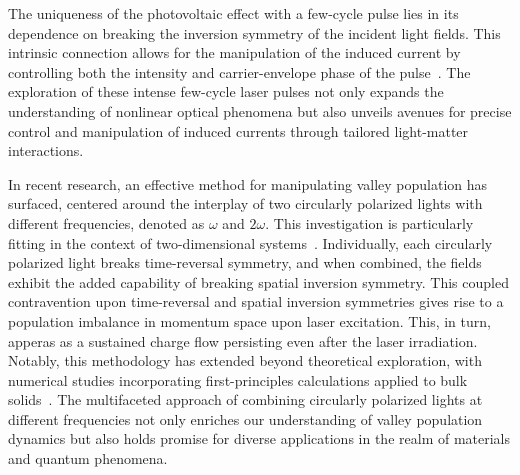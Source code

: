 The uniqueness of the photovoltaic effect with a few-cycle pulse lies in its dependence on breaking the inversion symmetry of the incident light fields. This intrinsic connection allows for the manipulation of the induced current by controlling both the intensity and carrier-envelope phase of the pulse~\cite{Schiffrin2013,Higuchi2017}. The exploration of these intense few-cycle laser pulses not only expands the understanding of nonlinear optical phenomena but also unveils avenues for precise control and manipulation of induced currents through tailored light-matter interactions.


In recent research, an effective method for manipulating valley population has surfaced, centered
around the interplay of two circularly polarized lights with different frequencies, denoted as
$\omega$ and $2\omega$. This investigation is particularly fitting in the context of
two-dimensional systems~\cite{Jimenez-Galan2020,Mrudul:21}. Individually, each circularly polarized
light breaks time-reversal symmetry, and when combined, the fields exhibit the added capability of
breaking spatial inversion symmetry. This coupled contravention upon time-reversal and spatial
inversion symmetries gives rise to a population imbalance in momentum space upon laser excitation.
This, in turn, apperas as a sustained charge flow persisting even after the laser irradiation. Notably, this methodology has extended beyond theoretical exploration, with numerical studies incorporating first-principles calculations applied to bulk solids~\cite{PhysRevLett.127.126601}. The multifaceted approach of combining circularly polarized lights at different frequencies not only enriches our understanding of valley population dynamics but also holds promise for diverse applications in the realm of materials and quantum phenomena.
